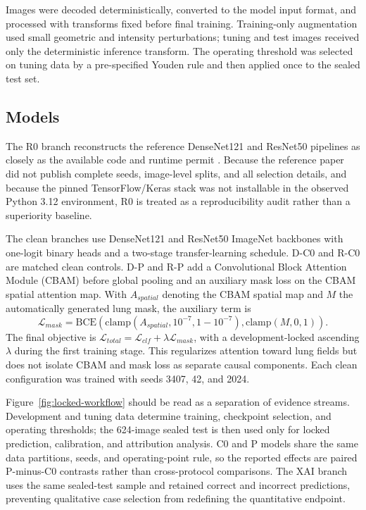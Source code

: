 \documentclass[runningheads]{llncs}
\newcommand{\citep}[1]{\cite{#1}}
\begin{document}
Images were decoded deterministically, converted to the model input format, and
processed with transforms fixed before final training. Training-only augmentation
used small geometric and intensity perturbations; tuning and test images received
only the deterministic inference transform. The operating threshold was selected
on tuning data by a pre-specified Youden rule and then applied once to the sealed
test set.

\subsection{Models}

The R0 branch reconstructs the reference DenseNet121 and ResNet50 pipelines as
closely as the available code and runtime permit \citep{erukude2025}. Because the
reference paper did not publish complete seeds, image-level splits, and all
selection details, and because the pinned TensorFlow/Keras stack was not
installable in the observed Python 3.12 environment, R0 is treated as a
reproducibility audit rather than a superiority baseline.

The clean branches use DenseNet121 and ResNet50 ImageNet backbones with one-logit
binary heads and a two-stage transfer-learning schedule. D-C0 and R-C0 are matched
clean controls. D-P and R-P add a Convolutional Block Attention Module (CBAM)
\citep{woo2018cbam} before global pooling and an auxiliary mask loss on the CBAM
spatial attention map. With $A_{spatial}$ denoting the CBAM spatial map and $M$
the automatically generated lung mask, the auxiliary term is
\begin{equation}
\mathcal{L}_{mask} =
\mathrm{BCE}(\mathrm{clamp}(A_{spatial},10^{-7},1-10^{-7}),\mathrm{clamp}(M,0,1)).
\end{equation}
The final objective is
$\mathcal{L}_{total}=\mathcal{L}_{clf}+\lambda\mathcal{L}_{mask}$, with a
development-locked ascending $\lambda$ during the first training stage. This
regularizes attention toward lung fields but does not isolate CBAM and mask loss
as separate causal components. Each clean configuration was trained with seeds
3407, 42, and 2024.

Figure~\ref{fig:locked-workflow} should be read as a separation of evidence
streams. Development and tuning data determine training, checkpoint selection,
and operating thresholds; the 624-image sealed test is then used only for locked
prediction, calibration, and attribution analysis. C0 and P models share the same
data partitions, seeds, and operating-point rule, so the reported effects are
paired P-minus-C0 contrasts rather than cross-protocol comparisons. The XAI branch
uses the same sealed-test sample and retained correct and incorrect predictions,
preventing qualitative case selection from redefining the quantitative endpoint.
\end{document}
